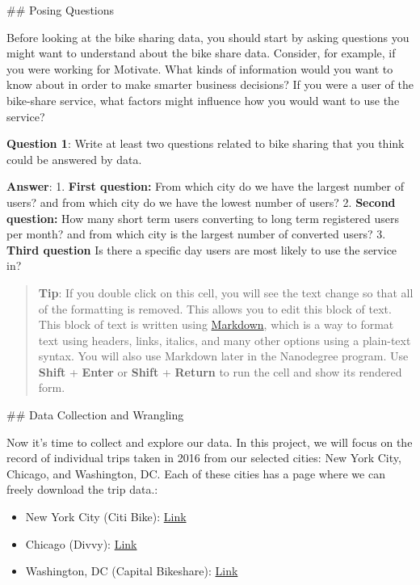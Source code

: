 \documentclass[11pt]{article}
\providecommand{\tightlist}{%
      \setlength{\itemsep}{0pt}\setlength{\parskip}{0pt}}
\begin{document}
     \#\# Posing Questions

Before looking at the bike sharing data, you should start by asking
questions you might want to understand about the bike share data.
Consider, for example, if you were working for Motivate. What kinds of
information would you want to know about in order to make smarter
business decisions? If you were a user of the bike-share service, what
factors might influence how you would want to use the service?

\textbf{Question 1}: Write at least two questions related to bike
sharing that you think could be answered by data.

\textbf{Answer}: 1. \textbf{First question:} From which city do we have
the largest number of users? and from which city do we have the lowest
number of users? 2. \textbf{Second question:} How many short term users
converting to long term registered users per month? and from which city
is the largest number of converted users? 3. \textbf{Third question} Is
there a specific day users are most likely to use the service in?

\begin{quote}
\textbf{Tip}: If you double click on this cell, you will see the text
change so that all of the formatting is removed. This allows you to edit
this block of text. This block of text is written using
\href{http://daringfireball.net/projects/markdown/syntax}{Markdown},
which is a way to format text using headers, links, italics, and many
other options using a plain-text syntax. You will also use Markdown
later in the Nanodegree program. Use \textbf{Shift} + \textbf{Enter} or
\textbf{Shift} + \textbf{Return} to run the cell and show its rendered
form.
\end{quote}

     \#\# Data Collection and Wrangling

Now it's time to collect and explore our data. In this project, we will
focus on the record of individual trips taken in 2016 from our selected
cities: New York City, Chicago, and Washington, DC. Each of these cities
has a page where we can freely download the trip data.:

\begin{itemize}
\tightlist
\item
  New York City (Citi Bike):
  \href{https://www.citibikenyc.com/system-data}{Link}
\item
  Chicago (Divvy): \href{https://www.divvybikes.com/system-data}{Link}
\item
  Washington, DC (Capital Bikeshare):
  \href{https://www.capitalbikeshare.com/system-data}{Link}
\end{itemize}
\end{document}
